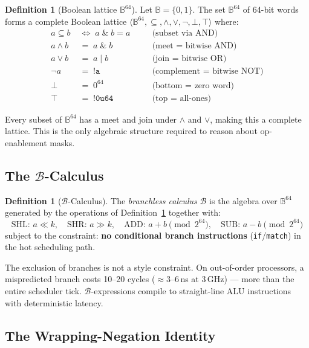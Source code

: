 \documentclass[12pt,a4paper]{article}
\theoremstyle{definition}
\newtheorem{definition}[theorem]{Definition}
\theoremstyle{remark}
\newcommand{\B}{\mathbb{B}}
\newcommand{\Lattice}[1]{\langle #1 \rangle}
\begin{document}
\begin{definition}[Boolean lattice $\B^{64}$]
\label{def:bool}
Let $\B = \{0,1\}$.
The set $\B^{64}$ of 64-bit words forms a complete Boolean lattice
$\Lattice{\B^{64}, \subseteq, \wedge, \vee, \neg, \bot, \top}$ where:
\begin{align*}
  a \subseteq b \;&\iff\; a \;\&\; b = a \quad&& \text{(subset via AND)}\\
  a \wedge b     \;&=\; a \;\&\; b          && \text{(meet = bitwise AND)}\\
  a \vee b       \;&=\; a \;|\; b           && \text{(join = bitwise OR)}\\
  \neg a         \;&=\; \mathtt{!a}         && \text{(complement = bitwise NOT)}\\
  \bot           \;&=\; 0^{64}              && \text{(bottom = zero word)}\\
  \top           \;&=\; \mathtt{!0u64}      && \text{(top = all-ones)}
\end{align*}
\end{definition}

Every subset of $\B^{64}$ has a meet and join under $\wedge$ and $\vee$, making this
a complete lattice.
This is the only algebraic structure required to reason about op-enablement masks.

\subsection{The \texorpdfstring{$\mathcal{B}$}{B}-Calculus}

\begin{definition}[$\mathcal{B}$-Calculus]
\label{def:bcalc}
The \emph{branchless calculus} $\mathcal{B}$ is the algebra over $\B^{64}$
generated by the operations of Definition~\ref{def:bool} together with:
\[
  \text{SHL: } a \ll k, \quad
  \text{SHR: } a \gg k, \quad
  \text{ADD: } a + b \pmod{2^{64}}, \quad
  \text{SUB: } a - b \pmod{2^{64}}
\]
subject to the constraint: \textbf{no conditional branch instructions}
(\texttt{if}/\texttt{match}) in the hot scheduling path.
\end{definition}

The exclusion of branches is not a style constraint.
On out-of-order processors, a mispredicted branch costs 10--20 cycles ($\approx$3--6\,ns at
3\,GHz) --- more than the entire scheduler tick.
$\mathcal{B}$-expressions compile to straight-line ALU instructions
with deterministic latency.

\subsection{The Wrapping-Negation Identity}
\end{document}
